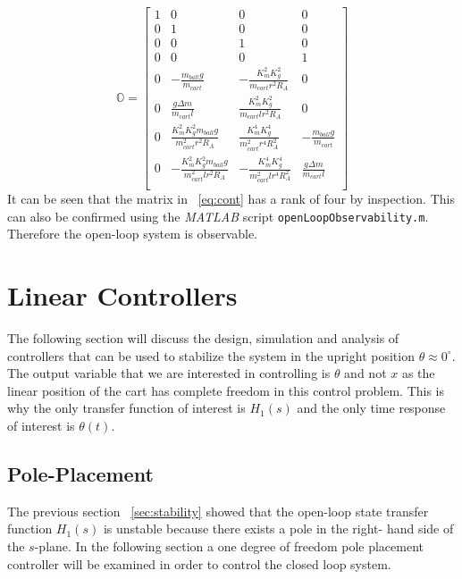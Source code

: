 \documentclass[12pt]{article} %
\begin{document}
\begin{equation} \label{eq:cont}
\mathbb{O} = 
\begin{bmatrix}
1 & 0 & 0 & 0 \\
0 & 1 & 0 & 0 \\
0 & 0 & 1 & 0 \\
0 & 0 & 0 & 1 \\
0 & -\frac{m_{ball}g}{m_{cart}} & -\frac{K_m^2K_g^2}{m_{cart}r^2R_A} & 0 \\
0 & \frac{g \Delta m}{m_{cart}l} & \frac{K_m^2K_g^2}{m_{cart}lr^2R_A} & 0 \\
0 & \frac{K_m^2K_g^2m_{ball}g}{m_{cart}^2r^2R_A} & \frac{K_m^4K_g^4}{m_{cart}^2r^4R_A^2} &  -\frac{m_{ball}g}{m_{cart}} \\
0 & -\frac{K_m^2K_g^2m_{ball}g}{m_{cart}^2lr^2R_A} & -\frac{K_m^4K_g^4}{m_{cart}^2lr^4R_A^2} & \frac{g \Delta m}{m_{cart}l} \\
\end{bmatrix}
\end{equation}
It can be seen that the matrix in ~\ref{eq:cont} has a rank of four by inspection. This can also be confirmed using the \textit{MATLAB} script   \texttt{openLoopObservability.m}. Therefore the open-loop system is observable.
\section{Linear Controllers}
The following section will discuss the design, simulation and analysis of controllers that can be used to stabilize the system in the upright position $\theta \approx 0^{\circ}$. The output variable that we are interested in controlling is $\theta$ and not $x$ as the linear position of the cart has complete freedom in this control problem. This is why the only transfer function of interest is $H_1(s)$ and the only time response of interest is $\theta(t)$.
\subsection{Pole-Placement}\label{sec:oneDOF}

The previous section ~\ref{sec:stability} showed that the open-loop state transfer function $H_1(s)$ is unstable because there exists a pole in the right- hand side of the $s$-plane. In the following section a one degree of freedom pole placement controller will be examined in order to control the closed loop system. 
\end{document}
